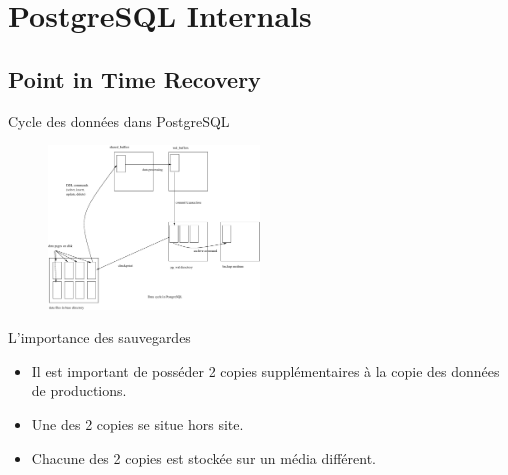 \section{PostgreSQL Internals}


\subsection{Point in Time Recovery}


\begin{frame}{Cycle des données dans PostgreSQL}

\begin{figure}
\begin{center}
\includegraphics[angle=0, width=0.5\textwidth]{images/internals.eps}
\end{center}
\end{figure}

\begin{toile}
\end{toile}

\end{frame}


\begin{frame}{L'importance des sauvegardes}

\begin{itemize}

\item Il est important de posséder 2 copies supplémentaires à la copie des données de productions.
\item Une des 2 copies se situe hors site.
\item Chacune des 2 copies est stockée sur un média différent.

\end{itemize}

\begin{toile}
\end{toile}

\end{frame}

